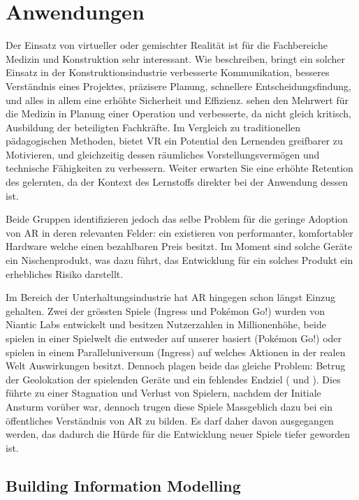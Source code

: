\documentclass[a4paper]{scrreprt}
\begin{document}
\section{Anwendungen}

Der Einsatz von virtueller oder gemischter Realität ist für die Fachbereiche Medizin und Konstruktion sehr interessant. Wie \citeauthor{Piroozfar2018} beschreiben, bringt ein solcher Einsatz in der Konstruktionsindustrie verbesserte Kommunikation, besseres Verständnis eines Projektes, präzisere Planung, schnellere Entscheidungsfindung, und alles in allem eine erhöhte Sicherheit und Effizienz. \citeauthor{Pelargos2017} sehen den Mehrwert für die Medizin in Planung einer Operation und verbesserte, da nicht gleich kritisch, Ausbildung der beteiligten Fachkräfte. Im Vergleich zu traditionellen pädagogischen Methoden, bietet VR ein Potential den Lernenden greifbarer zu Motivieren, und gleichzeitig dessen räumliches Vorstellungsvermögen und technische Fähigkeiten zu verbessern. Weiter erwarten Sie eine erhöhte Retention des gelernten, da der Kontext des Lernstoffs direkter bei der Anwendung dessen ist.

Beide Gruppen identifizieren jedoch das selbe Problem für die geringe Adoption von AR in deren relevanten Felder: ein existieren von performanter, komfortabler Hardware welche einen bezahlbaren Preis besitzt. Im Moment sind solche Geräte ein Nischenprodukt, was dazu führt, das Entwicklung für ein solches Produkt ein erhebliches Risiko darstellt.

Im Bereich der Unterhaltungsindustrie hat AR hingegen schon längst Einzug gehalten. Zwei der grössten Spiele (Ingress und Pokémon Go!) wurden von Niantic Labs entwickelt und besitzen Nutzerzahlen in Millionenhöhe, beide spielen in einer Spielwelt die entweder auf unserer basiert (Pokémon Go!) oder spielen in einem Paralleluniversum (Ingress) auf welches Aktionen in der realen Welt Auswirkungen besitzt. Dennoch plagen beide das gleiche Problem: Betrug der Geolokation der spielenden Geräte und ein fehlendes Endziel (\cite{MRRX2015} und \cite{KamelBoulos2017}). Dies führte zu einer Stagnation und Verlust von Spielern, nachdem der Initiale Ansturm vorüber war, dennoch trugen diese Spiele Massgeblich dazu bei ein öffentliches Verständnis von AR zu bilden. Es darf daher davon ausgegangen werden, das dadurch die Hürde für die Entwicklung neuer Spiele tiefer geworden ist.

\subsection{Building Information Modelling}
\end{document}
